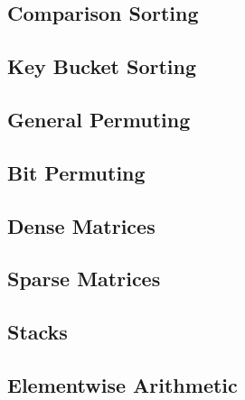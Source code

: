 
\subsection{Comparison Sorting}
\label{sec:ref-imp-ami-sort}


\subsection{Key Bucket Sorting}
\label{sec:ref-imp-ami-kb-sort}


\subsection{General Permuting}
\label{sec:ref-imp-ami-gp}


\subsection{Bit Permuting}
\label{sec:ref-imp-ami-bp}


\subsection{Dense Matrices}
\label{sec:ref-imp-ami-matrix}


\subsection{Sparse Matrices}
\label{sec:ref-imp-ami-sm}


\subsection{Stacks}
\label{sec:ref-imp-ami-stack}


\subsection{Elementwise Arithmetic}
\label{sec:ref-imp-ami-arith}

